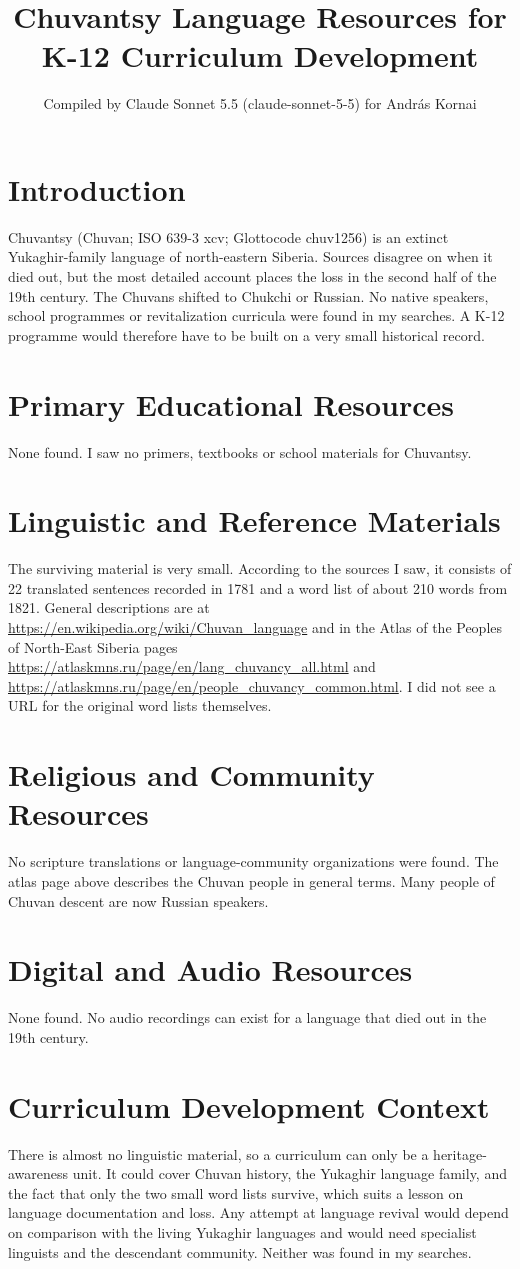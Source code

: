 \documentclass[12pt]{article}
\title{Chuvantsy Language Resources for K-12 Curriculum Development}
\author{Compiled by Claude Sonnet 5.5 (claude-sonnet-5-5) for Andr\'as Kornai}
\date{}
\begin{document}
\maketitle

\section{Introduction}
Chuvantsy (Chuvan; ISO 639-3 xcv; Glottocode chuv1256) is an extinct Yukaghir-family language of north-eastern Siberia. Sources disagree on when it died out, but the most detailed account places the loss in the second half of the 19th century. The Chuvans shifted to Chukchi or Russian. No native speakers, school programmes or revitalization curricula were found in my searches. A K-12 programme would therefore have to be built on a very small historical record.

\section{Primary Educational Resources}
None found. I saw no primers, textbooks or school materials for Chuvantsy.

\section{Linguistic and Reference Materials}
The surviving material is very small. According to the sources I saw, it consists of 22 translated sentences recorded in 1781 and a word list of about 210 words from 1821. General descriptions are at \url{https://en.wikipedia.org/wiki/Chuvan_language} and in the Atlas of the Peoples of North-East Siberia pages \url{https://atlaskmns.ru/page/en/lang_chuvancy_all.html} and \url{https://atlaskmns.ru/page/en/people_chuvancy_common.html}. I did not see a URL for the original word lists themselves.

\section{Religious and Community Resources}
No scripture translations or language-community organizations were found. The atlas page above describes the Chuvan people in general terms. Many people of Chuvan descent are now Russian speakers.

\section{Digital and Audio Resources}
None found. No audio recordings can exist for a language that died out in the 19th century.

\section{Curriculum Development Context}
There is almost no linguistic material, so a curriculum can only be a heritage-awareness unit. It could cover Chuvan history, the Yukaghir language family, and the fact that only the two small word lists survive, which suits a lesson on language documentation and loss. Any attempt at language revival would depend on comparison with the living Yukaghir languages and would need specialist linguists and the descendant community. Neither was found in my searches.
\end{document}
